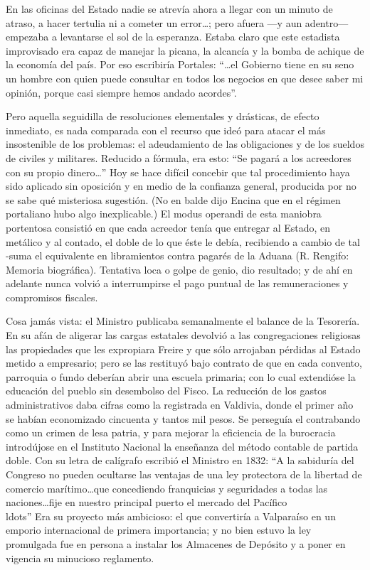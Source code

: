\documentclass[10pt,twoside,openright]{memoir}
\begin{document}
En las oficinas del Estado nadie se atrevía ahora a llegar con un minuto
de atraso, a hacer tertulia ni a cometer un error\ldots; pero afuera ---y
aun adentro--- empezaba a levantarse el sol de la esperanza. Estaba
claro que este estadista improvisado era capaz de manejar la picana, la
alcancía y la bomba de achique de la economía del país. Por eso
escribiría Portales: ``\ldots{}el Gobierno tiene en su seno un hombre
con quien puede consultar en todos los negocios en que desee saber mi
opinión, porque casi siempre hemos andado acordes''.

Pero aquella seguidilla de resoluciones elementales y drásticas, de
efecto inmediato, es nada comparada con el recurso que ideó para atacar
el más insostenible de los problemas: el adeudamiento de las
obligaciones y de los sueldos de civiles y militares. Reducido a
fórmula, era esto: ``Se pagará a los acreedores con su propio dinero\ldots''
Hoy se hace difícil concebir que tal procedimiento haya sido aplicado
sin oposición y en medio de la confianza general, producida por no se
sabe qué misteriosa sugestión. (No en balde dijo Encina que en el
régimen portaliano hubo algo inexplicable.) El modus operandi de esta
maniobra portentosa consistió en que cada acreedor tenía que entregar al
Estado, en metálico y al contado, el doble de lo que éste le debía,
recibiendo a cambio de tal -suma el equivalente en libramientos contra
pagarés de la Aduana (R. Rengifo: Memoria biográfica). Tentativa loca o
golpe de genio, dio resultado; y de ahí en adelante nunca volvió a
interrumpirse el pago puntual de las remuneraciones y compromisos
fiscales.

Cosa jamás vista: el Ministro publicaba semanalmente el balance de la
Tesorería. En su afán de aligerar las cargas estatales devolvió a las
congregaciones religiosas las propiedades que les expropiara Freire y
que sólo arrojaban pérdidas al Estado metido a empresario; pero se las
restituyó bajo contrato de que en cada convento, parroquia o fundo
deberían abrir una escuela primaria; con lo cual extendióse la educación
del pueblo sin desembolso del Fisco. La reducción de los gastos
administrativos daba cifras como la registrada en Valdivia, donde el
primer año se habían economizado cincuenta y tantos mil pesos. Se
perseguía el contrabando como un crimen de lesa patria, y para mejorar
la eficiencia de la burocracia introdújose en el Instituto Nacional la
enseñanza del método contable de partida doble. Con su letra de
calígrafo escribió el Ministro en 1832: ``A la sabiduría del Congreso no
pueden ocultarse las ventajas de una ley protectora de la libertad de
comercio marítimo\ldots que concediendo franquicias y seguridades a todas
las naciones\ldots fije en nuestro principal puerto el mercado del
Pacífico\\ldots'' Era su proyecto más ambicioso: el que convertiría a
Valparaíso en un emporio internacional de primera importancia; y no bien
estuvo la ley promulgada fue en persona a instalar los Almacenes de
Depósito y a poner en vigencia su minucioso reglamento.
\end{document}
